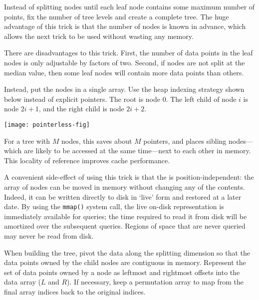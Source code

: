 \label{trick:complete}
Instead of splitting nodes until each leaf node contains some maximum
number of points, fix the number of tree levels and create a complete
tree.  The huge advantage of this trick is that the number of nodes is
known in advance, which allows the next trick to be used without
wasting any memory.

There are disadvantages to this trick.  First, the number of data
points in the leaf nodes is only adjustable by factors of two.
Second, if nodes are not split at the median value, then some leaf
nodes will contain more data points than others.

\label{trick:nopointers}
Instead, put the nodes in a single array.  Use the heap indexing
strategy shown below instead of explicit pointers.
The root is node $0$.  The left child of node $i$ is node $2i + 1$,
and the right child is node $2i + 2$.

\nonumberparagraphs
\begin{center}
\texttt{[image: pointerless-fig]}
\end{center}
\numberparagraphs

For a tree with $M$ nodes, this saves about $M$ pointers, and places
sibling nodes---which are likely to be accessed at the same
time---next to each other in memory.  This locality of reference
improves cache performance.


A convenient side-effect of using this trick is that the \kdtree is
position-independent: the array of nodes can be moved in memory without
changing any of the contents.  Indeed, it can be written directly to
disk in `live' form and restored at a later date.  By using the
{\tt mmap()} system call, the live on-disk representation is
immediately available for queries; the time required to read it
from disk will be amortized over the subsequent queries.  Regions of
space that are never queried may never be read from disk.


\label{trick:pivot}
When building the tree, pivot the data along the splitting dimension
so that the data points owned by the child nodes are contiguous in
memory.  Represent the set of data points owned by a node as leftmost
and rightmost offsets into the data array ($L$ and $R$).  If
necessary, keep a permutation array to map from the final array
indices back to the original indices.

